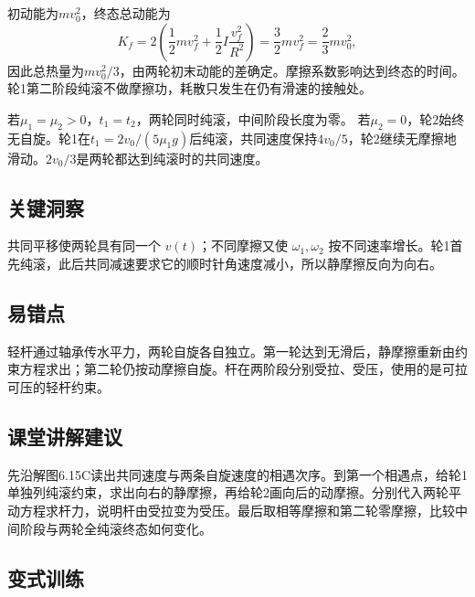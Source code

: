 \documentclass[UTF8,fontset=fandol,a4paper,11pt]{ctexart}
\begin{document}
初动能为$mv_0^2$，终态总动能为
\[
K_f=2\left(\frac12mv_f^2+\frac12I\frac{v_f^2}{R^2}\right)
=\frac32mv_f^2=\frac23mv_0^2,
\]
因此总热量为$mv_0^2/3$，由两轮初末动能的差确定。摩擦系数影响达到终态的时间。
轮1第二阶段纯滚不做摩擦功，耗散只发生在仍有滑速的接触处。

若$\mu_1=\mu_2>0$，$t_1=t_2$，两轮同时纯滚，中间阶段长度为零。
若$\mu_2=0$，轮2始终无自旋。轮1在$t_1=2v_0/(5\mu_1g)$后纯滚，共同速度保持$4v_0/5$，轮2继续无摩擦地滑动。$2v_0/3$是两轮都达到纯滚时的共同速度。




\subsection*{关键洞察}

共同平移使两轮具有同一个 $v(t)$；不同摩擦又使 $\omega_1,\omega_2$ 按不同速率增长。轮1首先纯滚，此后共同减速要求它的顺时针角速度减小，所以静摩擦反向为向右。



\subsection*{易错点}

轻杆通过轴承传水平力，两轮自旋各自独立。第一轮达到无滑后，静摩擦重新由约束方程求出；第二轮仍按动摩擦自旋。杆在两阶段分别受拉、受压，使用的是可拉可压的轻杆约束。



\subsection*{课堂讲解建议}

先沿解图6.15C读出共同速度与两条自旋速度的相遇次序。到第一个相遇点，给轮1单独列纯滚约束，求出向右的静摩擦，再给轮2画向后的动摩擦。分别代入两轮平动方程求杆力，说明杆由受拉变为受压。最后取相等摩擦和第二轮零摩擦，比较中间阶段与两轮全纯滚终态如何变化。




\subsection*{变式训练}
\end{document}
